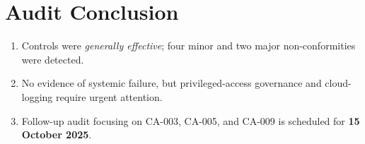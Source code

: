 \section{Audit Conclusion}
\begin{enumerate}
  \item Controls were \emph{generally effective}; four minor and two major
        non-conformities were detected.
  \item No evidence of systemic failure, but privileged-access governance
        and cloud-logging require urgent attention.
  \item Follow-up audit focusing on CA-003, CA-005, and CA-009 is scheduled
        for \textbf{15 October 2025}.
\end{enumerate}
